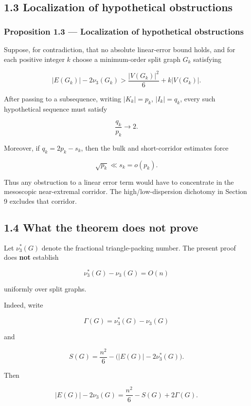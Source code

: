 \documentclass[
  11pt,
]{article}
\begin{document}
\subsection{1.3 Localization of hypothetical
obstructions}\label{localization-of-hypothetical-obstructions}

\subsubsection{Proposition 1.3 --- Localization of hypothetical
obstructions}\label{proposition-1.3-localization-of-hypothetical-obstructions}

Suppose, for contradiction, that no absolute linear-error bound holds,
and for each positive integer \(k\) choose a minimum-order split graph
\(G_k\) satisfying

\[
|E(G_k)|-2\nu_3(G_k)>\frac{|V(G_k)|^2}{6}+k|V(G_k)|.
\]

After passing to a subsequence, writing \(|K_k|=p_k\), \(|I_k|=q_k\),
every such hypothetical sequence must satisfy

\[
\frac{q_k}{p_k}\longrightarrow 2.
\]

Moreover, if \(q_k=2p_k-s_k\), then the bulk and short-corridor
estimates force

\[
\sqrt{p_k}\ll s_k=o(p_k).
\]

Thus any obstruction to a linear error term would have to concentrate in
the mesoscopic near-extremal corridor. The high/low-dispersion dichotomy
in Section 9 excludes that corridor.

\subsection{1.4 What the theorem does not
prove}\label{what-the-theorem-does-not-prove}

Let \(\nu_3^*(G)\) denote the fractional triangle-packing number. The
present proof does \textbf{not} establish

\[
\nu_3^*(G)-\nu_3(G)=O(n)
\tag{1.4}
\]

uniformly over split graphs.

Indeed, write

\[
\Gamma(G)=\nu_3^*(G)-\nu_3(G)
\]

and

\[
S(G)=\frac{n^2}{6}-\bigl(|E(G)|-2\nu_3^*(G)\bigr).
\]

Then

\[
|E(G)|-2\nu_3(G)
=
\frac{n^2}{6}-S(G)+2\Gamma(G).
\tag{1.5}
\]
\end{document}
